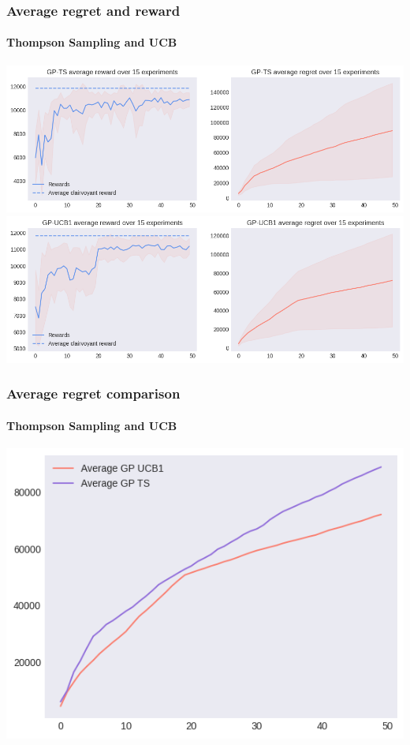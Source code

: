 \begin{frame}[plain]

\frametitle{Average regret and reward}
\framesubtitle{Thompson Sampling and UCB}

\begin{center}
	\hspace*{-1em}
	\includegraphics[scale=0.42]{img/Graphs/uncertain_alpha_unit/image4.png}
	\hspace*{-1em}
	\includegraphics[scale=0.42]{img/Graphs/uncertain_alpha_unit/image5.png}
\end{center}

\end{frame}


\begin{frame}[plain]

\frametitle{Average regret comparison}
\framesubtitle{Thompson Sampling and UCB}

\begin{center}
	\hspace*{-2.8em}
	\includegraphics[scale=0.55]{img/Graphs/uncertain_alpha_unit/image6.png}
\end{center}

\end{frame}

